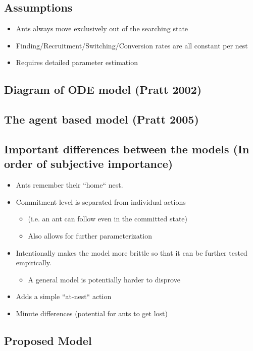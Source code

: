\documentclass[letterpaper]{article}
\newcommand{\sitem}[1]
{
    \begin{itemize}
        \item #1
    \end{itemize}
}
\begin{document}
  \subsection{Assumptions}
      \begin{itemize}
          \item Ants always move exclusively out of the searching state
          \item Finding/Recruitment/Switching/Conversion rates are all constant per nest
          \item Requires detailed parameter estimation
      \end{itemize}

  \subsection{Diagram of ODE model (Pratt 2002)}

  \subsection{The agent based model (Pratt 2005)}

  \subsection{Important differences between the models (In order of subjective importance)}
      \begin{itemize}
          \item Ants remember their ``home`` nest.
          \item Commitment level is separated from individual actions 
              \sitem{(i.e. an ant can follow even in the committed state)}
              \sitem{Also allows for further parameterization}
          \item Intentionally makes the model more brittle so that it can be further tested empirically. 
              \sitem{A general model is potentially harder to disprove}
          \item Adds a simple ``at-nest`` action 
          \item Minute differences (potential for ants to get lost)
      \end{itemize}

  \subsection{Proposed Model}
\end{document}
